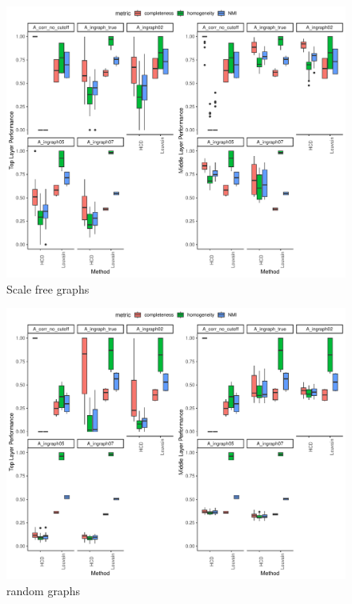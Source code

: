 \documentclass[
]{article}
\begin{document}
\begin{figure}
\centering
\includegraphics{Lab_report_4_1_2024_files/figure-latex/unnamed-chunk-9-1.pdf}
\caption{Scale free graphs}
\end{figure}

\begin{figure}
\centering
\includegraphics{Lab_report_4_1_2024_files/figure-latex/unnamed-chunk-10-1.pdf}
\caption{random graphs}
\end{figure}


    
\end{document}
